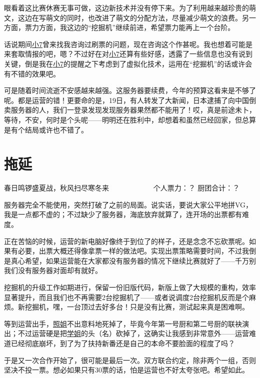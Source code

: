 眼看着这比赛休赛无事可做，这边新技术并没有停下来。为了利用越来越珍贵的萌文，这边在写萌文的同时，也改进了萌文的分配方法，尽量减少萌文的浪费。另一方面，票力方面，我这边的“挖掘机”继续前进，希望票力能再上一个台阶。

话说期间\uline{小7}曾来找我咨询过刷票的问题，现在咨询这个作甚呢。我也想着可能是来套取情报的吧，嗯？不过好在对\uline{小7}还算有些好感，透露了一些信息也没有说到关键，倒是我在\uline{小7}的提醒之下考虑到了虚拟化技术，运用在“挖掘机”的话或许会有不错的效果吧。

可是随着时间流逝不安感越来越强。这服务器要续费，今年的预算这看来是不够了呢。都是运营的错！更要命的是，19日，有人转发了大新闻，日本逮捕了向中国倒卖服务器的人，我们一登录发现发现服务器果然都不能用了！哎，真是前途未卜，等待，不安，何时是个头呢——明明还在胜利中，却想着和虽然已经回家，但总算是有个结局或许也不错了。

\chapter{拖延}
\begin{center}
{\subTitle 春日鸣锣盛夏战，秋风扫尽寒冬来}
\subMemo
　　　　　　个人票力：？ 厨团合计：？
\end{center}

服务器完全不能使用，突然打破了之前的局面。说实话，要说大家公平地拼VG，我是一点都不虚的；不过缺少了服务器，海底放弃就算了，连开场的出票都有难度。

正在苦恼的时候，运营的新电脑好像终于到位了的样子，还是念念不忘砍票呢。如果有必要，出票大概还得像拿票一样的做法吧。实现出票策略需要时间，不过我倒是真心希望，如果运营能在大家都没有服务器的情况下继续比赛就好了——千万别我们没有服务器对面却有就好。

挖掘机的升级工作如期进行，保留一份旧版代码，新版上做了大规模的重构，效率显著提升，而且我们也不再需要2台挖掘机了——或者说调度2台挖掘机反而是个麻烦。新挖掘机，嘿，一台顶过去好多台！只是没有比赛，测试起来真是困难啊。

等到运营出手，\uline{照姐}不出意料地死掉了，毕竟今年第一号厨和第二号厨的联袂演出；不过运营硬是把\uline{学姐}的头（名）砍掉了，这确实让我感到非常意外——运营难道已经彻底崩坏，到了为了扶持新番还是自己的本命不要脸面的程度了吗？

于是又一次合作开始了，很可能是最后一次。双方联合约定，除非两个一组，否则坚决不投一票。想必如果只有30票的话，怕是运营也不好太夸张吧。希望如此。

